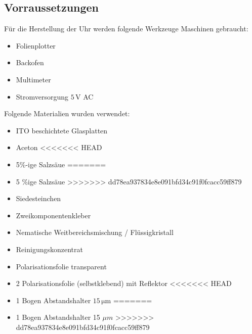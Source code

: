 \subsection{Vorraussetzungen}
Für die Herstellung der Uhr werden folgende Werkzeuge Maschinen gebraucht:
\begin{itemize}
\item Folienplotter
\item Backofen
\item Multimeter
\item Stromversorgung \(5\,\mathrm{V}\) AC

\end{itemize}
Folgende Materialien wurden verwendet:
\begin{itemize}
\item ITO beschichtete Glasplatten
\item Aceton
<<<<<<< HEAD
\item 5\%-ige Salzsäue
=======
\item 5 \%ige Salzsäue
>>>>>>> dd78ea937834e8e091bfd34c91f0fcacc59ff879
\item Siedesteinchen
\item Zweikomponentenkleber
\item Nematische Weitbereichsmischung / Flüssigkristall
\item Reinigungskonzentrat
\item Polarisationsfolie transparent
\item 2 Polarisationsfolie (selbstklebend) mit Reflektor
<<<<<<< HEAD
\item 1 Bogen Abstandshalter \(15\,\mathrm{\mu m}\)
=======
\item 1 Bogen Abstandshalter 15 \(\mu m\)
>>>>>>> dd78ea937834e8e091bfd34c91f0fcacc59ff879
\end{itemize}